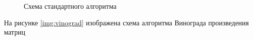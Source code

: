 \documentclass[a4paper,12pt]{article}
\begin{document}
\begin{figure}[H]
    \caption{Схема стандартного алгоритма}
    \label{img:default}
\end{figure}

На рисунке \ref{img:vinograd} изображена схема алгоритма
Винограда произведения матриц
\end{document}
